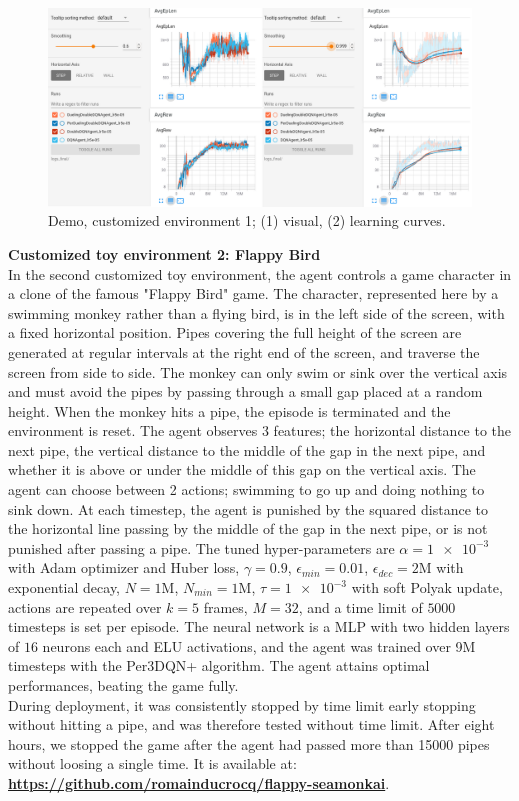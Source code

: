 \begin{figure}[h]
\includegraphics[width=\textwidth]{img/I/Selection_100.png}
\centering
\captionsetup{justification=centering}
\caption{Demo, customized environment 1; (1) visual, (2) learning curves.}
\end{figure}

\pagebreak

\textbf{Customized toy environment 2: Flappy Bird} \\
In the second customized toy environment, the agent controls a game character in a clone of the famous "Flappy Bird" game. The character, represented here by a swimming monkey rather than a flying bird, is in the left side of the screen, with a fixed horizontal position. Pipes covering the full height of the screen are generated at regular intervals at the right end of the screen, and traverse the screen from side to side. The monkey can only swim or sink over the vertical axis and must avoid the pipes by passing through a small gap placed at a random height. When the monkey hits a pipe, the episode is terminated and the environment is reset. The agent observes 3 features; the horizontal distance to the next pipe, the vertical distance to the middle of the gap in the next pipe, and whether it is above or under the middle of this gap on the vertical axis. The agent can choose between 2 actions; swimming to go up and doing nothing to sink down. At each timestep, the agent is punished by the squared distance to the horizontal line passing by the middle of the gap in the next pipe, or is not punished after passing a pipe. The tuned hyper-parameters are $\alpha=\num{1e-3}$ with Adam optimizer and Huber loss, $\gamma=0.9$, $\epsilon_{min}=0.01$, $\epsilon_{dec}=2$M with exponential decay, $N=1$M, $N_{min}=1$M, $\tau=\num{1e-3}$ with soft Polyak update, actions are repeated over $k=5$ frames, $M=32$, and a time limit of $5000$ timesteps is set per episode. The neural network is a MLP with two hidden layers of $16$ neurons each and ELU activations, and the agent was trained over 9M timesteps with the Per3DQN+ algorithm. The agent attains optimal performances, beating the game fully. \\
During deployment, it was consistently stopped by time limit early stopping without hitting a pipe, and was therefore tested without time limit. After eight hours, we stopped the game after the agent had passed more than 15000 pipes without loosing a single time.
It is available at: \textbf{\url{https://github.com/romainducrocq/flappy-seamonkai}}.

